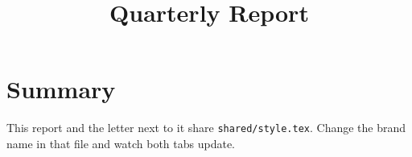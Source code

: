 \documentclass[11pt]{article}
\title{Quarterly Report}
\author{\brand}
\begin{document}
\maketitle
\tableofcontents
\section{Summary}
This report and the letter next to it share \texttt{shared/style.tex}.
Change the brand name in that file and watch both tabs update.
\end{document}
